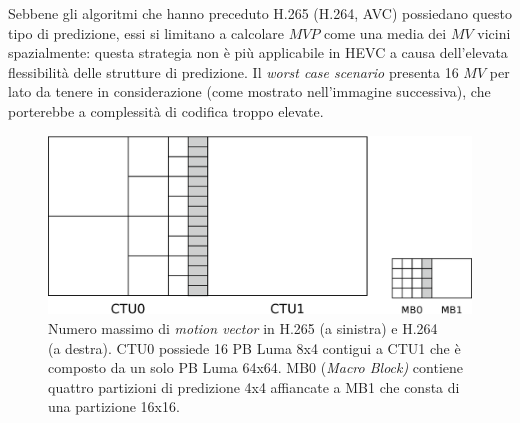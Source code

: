 Sebbene gli algoritmi che hanno preceduto H.265 (H.264, AVC) possiedano questo 
tipo di predizione, essi si limitano a calcolare $MVP$ come una media dei $MV$ 
vicini spazialmente: questa strategia non è più applicabile in HEVC a causa 
dell'elevata flessibilità delle strutture di predizione.
Il \emph{worst case scenario} presenta 16 $MV$ per lato da tenere in 
considerazione (come mostrato nell'immagine successiva), che porterebbe a 
complessità di codifica troppo elevate.

\begin{figure}[H]
  \captionsetup{justification=raggedright}
  \centering
  \includegraphics[scale=0.45]{Figures/Inter_pred_2}
    \caption[Numero massimo di \emph{motion vector} in H.265 e H.264]
    {Numero massimo di \emph{motion vector} in H.265 (a sinistra) e H.264 \\
      (a destra). CTU0 possiede 16 PB Luma 8x4 contigui a CTU1 che è composto da
      un solo PB Luma 64x64. MB0 (\emph{Macro Block)} contiene quattro 
      partizioni di predizione 4x4 affiancate a MB1 che consta di una 
      partizione 16x16. }
\end{figure}

